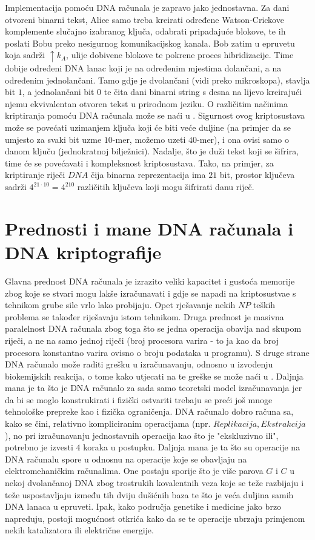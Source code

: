 \documentclass[a4paper,oneside,12pt]{memoir} %
\begin{document}
\begin{spacing}{1.5}
Implementacija pomoću DNA računala je zapravo jako jednostavna. Za dani otvoreni binarni tekst, Alice samo treba kreirati određene Watson-Crickove komplemente slučajno izabranog ključa, odabrati pripadajuće blokove, te ih poslati Bobu preko nesigurnog komunikacijskog kanala. Bob zatim u epruvetu koja sadrži $\uparrow k_A$, ulije dobivene blokove te pokrene proces hibridizacije. Time dobije određeni DNA lanac koji je na određenim mjestima dolančani, a na određenim jednolančani. Tamo gdje je dvolančani (vidi preko mikroskopa), stavlja bit $1$, a jednolančani bit $0$ te čita dani binarni string s desna na lijevo kreirajući njemu ekvivalentan otvoren tekst u prirodnom jeziku. O različitim načinima kriptiranja pomoću DNA računala može se naći u \cite{borda2011fundamentals}. 
Sigurnost ovog kriptosustava može se povećati uzimanjem ključa koji će biti veće duljine (na primjer da se umjesto za svaki bit uzme $10$-mer, možemo uzeti $40$-mer), i ona ovisi samo o danom ključu (jednokratnoj bilježnici). Nadalje, što je duži tekst koji se šifrira, time će se povećavati i kompleksnost kriptosustava. Tako, na primjer, za kriptiranje riječi $DNA$ čija binarna reprezentacija ima $21$ bit, prostor ključeva sadrži $4^{21\cdot 10}=4^{210}$ različitih ključeva koji mogu šifrirati danu riječ. 
\section{Prednosti i mane DNA računala i DNA kriptografije}
Glavna prednost DNA računala je izrazito veliki kapacitet i gustoća memorije zbog koje se stvari mogu lakše izračunavati i gdje se napadi na kriptosustvae s tehnikom grube sile vrlo lako probijaju. Opet rješavanje nekih $NP$ teških problema se također riješavaju istom tehnikom. Druga prednost je masivna paralelnost DNA računala zbog  toga što se jedna operacija obavlja nad skupom riječi, a ne na samo jednoj riječi (broj procesora varira - to ja kao da broj procesora konstantno varira ovisno o broju podataka u programu). S druge strane DNA računalo može raditi grešku u izračunavanju, odnosno u izvođenju biokemijskih reakcija, o tome kako utjecati na te greške se može naći u \cite{DNAerr}. Daljnja mana je ta što je DNA računalo za sada samo teoretski model izračunavanja jer da bi se moglo konstrukirati i fizički ostvariti trebaju se preći još mnoge tehnološke prepreke kao i fizička ograničenja. DNA računalo dobro računa sa, kako se čini, relativno kompliciranim operacijama (npr. $Replikacija, Ekstrakcija$), no pri izračunavanju jednostavnih operacija kao što je "ekskluzivno ili", potrebno je izvesti $4$ koraka u postupku. Daljnja mana je ta što su operacije na DNA računalu spore u odnosnu na operacije koje se obavljaju na elektromehaničkim računalima. One postaju sporije što je više parova $G$ i $C$ u nekoj dvolančanoj DNA zbog trostrukih kovalentnih veza koje se teže razbijaju i teže uspostavljaju između tih dviju dušićnih baza te što je veća duljina samih DNA lanaca u epruveti. Ipak, kako područja genetike i medicine jako brzo napreduju, postoji mogućnost otkrića kako da se te operacije ubrzaju primjenom nekih katalizatora ili električne energije. 


\end{spacing}
\end{document}
